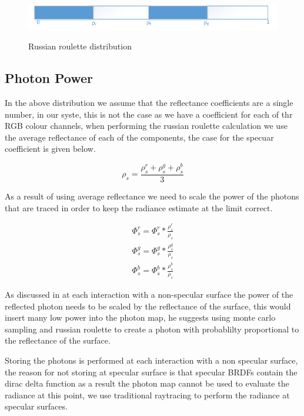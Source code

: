 \begin{figure}
\includegraphics{./images/russian_roulette_distribution.png}
\label{fig:rr_dist}
\caption{Russian roulette distribution}
\end{figure}

\subsection{Photon Power}
In the above distribution we assume that the reflectance coefficients are a single number, in our syste, this is not
the case as we have a coefficient for each of thr RGB colour channels, when performing the russian roulette calculation
we use the average reflectance of each of the components, the case for the specuar coefficient is given below.

\begin{equation}
\rho_s = \frac{\rho_s^r + \rho_s^g + \rho_s^b}{3}
\end{equation}

As a result of using average reflectance we need to scale the power of the photons that are traced in order to keep the
radiance estimate at the limit correct.

\begin{equation}
\begin{array}{lcr} \Phi_s^r = \Phi_s^r * \frac{\rho_s^r}{\rho_{s}}\\ \Phi_s^g = \Phi_s^g * \frac{\rho_s^g}{\rho_{s}}\\ \Phi_s^b = \Phi_s^b * \frac{\rho_s^b}{\rho_{s}}
\end{array}
\end{equation}

As discussed in  at each interaction with a non-specular surface the power of the reflected photon
needs to be scaled by the reflectance of the surface, this would insert many low power into the photon map, he suggests
using monte carlo sampling and russian roulette to create a photon with probablilty proportional to the reflectance
of the surface.

Storing the photons is performed at each interaction with a non specular surface, the reason for not storing at specular
surface is that specular BRDFs contain the dirac delta function as a result the photon map cannot be used to evaluate the
radiance at this point, we use traditional raytracing to perform the radiance at specular surfaces.

